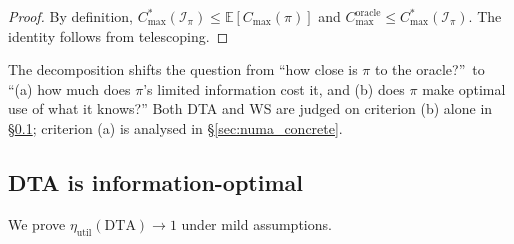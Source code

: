 \documentclass[11pt,a4paper]{report}
\begin{document}
\begin{proof}
By definition, $C_{\max}^*(\mathcal{I}_\pi) \leq \mathbb{E}[C_{\max}(\pi)]$
and $C_{\max}^{\mathrm{oracle}} \leq C_{\max}^*(\mathcal{I}_\pi)$.
The identity follows from telescoping.
\end{proof}

The decomposition shifts the question from
``how close is $\pi$ to the oracle?''\ to
``(a) how much does $\pi$'s limited information cost it, and
(b) does $\pi$ make optimal use of what it knows?''
Both DTA and WS are judged on criterion (b) alone in \S\ref{sec:info_optimality_proof};
criterion (a) is analysed in \S\ref{sec:numa_concrete}.

\subsection{DTA is information-optimal}
\label{sec:info_optimality_proof}

We prove $\eta_{\mathrm{util}}(\mathrm{DTA}) \to 1$ under mild assumptions.
\end{document}
